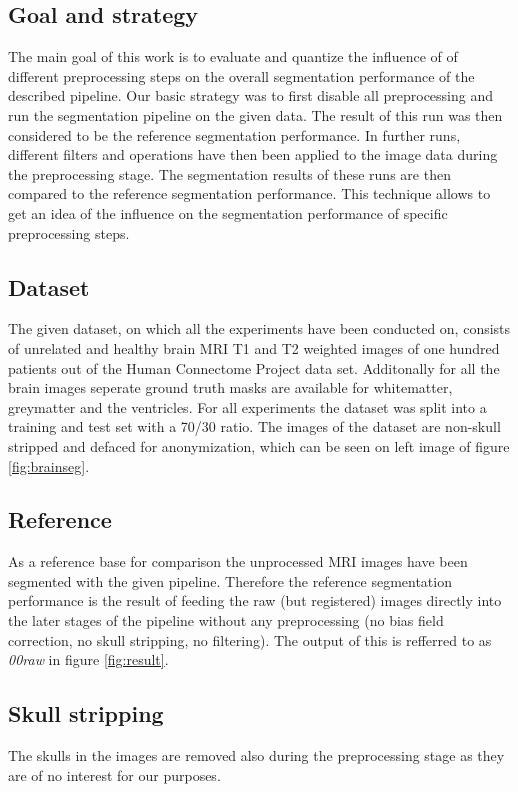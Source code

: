 \documentclass[journal]{IEEEtran}
\begin{document}
\subsection{Goal and strategy}
The main goal of this work is to evaluate and quantize the influence of of different preprocessing steps on the overall segmentation performance of the described pipeline. Our basic strategy was to first disable all preprocessing and run the segmentation pipeline on the given data. The result of this run was then considered to be the reference segmentation performance. In further runs, different filters and operations have then been applied to the image data during the preprocessing stage. The segmentation results of these runs are then compared to the reference segmentation performance. This technique allows to get an idea of the influence on the segmentation performance of specific preprocessing steps.

\subsection{Dataset}
The given dataset, on which all the experiments have been conducted on, consists of unrelated and healthy brain MRI T1 and T2 weighted images of one hundred patients out of the Human Connectome Project data set. Additonally for all the brain images seperate ground truth masks are available for whitematter, greymatter and the ventricles. For all experiments the dataset was split into a training and test set with a 70/30 ratio. The images of the dataset are non-skull stripped and defaced for anonymization, which can be seen on left image of figure \ref{fig:brainseg}.

\subsection{Reference}
As a reference base for comparison the unprocessed MRI images have been segmented with the given pipeline. Therefore the reference segmentation performance is the result of feeding the raw (but registered) images directly into the later stages of the pipeline without any preprocessing (no bias field correction, no skull stripping, no filtering). The output of this is refferred to as \textit{00raw} in figure \ref{fig:result}.

\subsection{Skull stripping}
The skulls in the images are removed also during the preprocessing stage as they are of no interest for our purposes.
\end{document}
